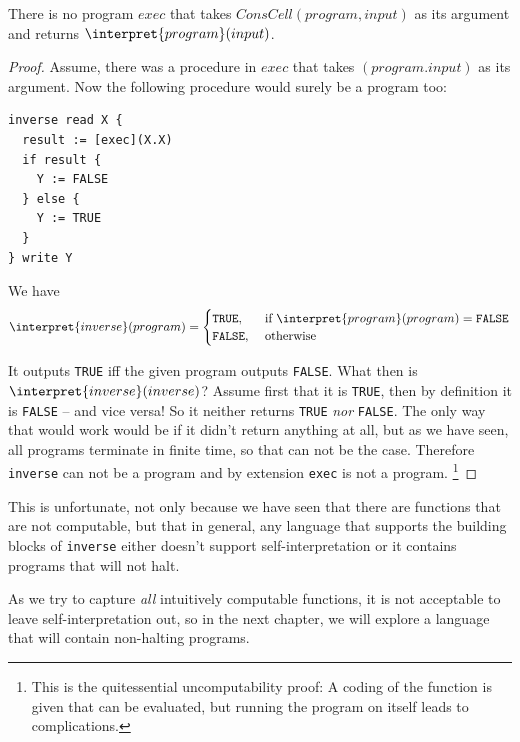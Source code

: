 \begin{theorem}
	There is no \FOR program $exec$ that takes $ConsCell(program, input)$ as its 
	argument and returns $\interpret{program}(input)$.
\end{theorem}
\begin{proof}
Assume, there was a procedure in \FOR $exec$ that takes $(program.input)$ as 
its argument. Now the following procedure would surely be a \FOR program too:

\begin{verbatim}
inverse read X {
  result := [exec](X.X)
  if result {
    Y := FALSE
  } else {
    Y := TRUE
  }
} write Y
\end{verbatim}

We have 
\[ \interpret{inverse}(program) = \begin{cases}
		\mathtt{TRUE}, &\text{ if }\interpret{program}(program) = \mathtt{FALSE} \\
		\mathtt{FALSE}, &\text{ otherwise }
	\end{cases} \]

It outputs {\tt TRUE} iff the given program outputs {\tt FALSE}. What then 
is $\interpret{inverse}(inverse)$? Assume first that it is 
{\tt TRUE}, then by definition it is {\tt FALSE} -- and vice versa! So it 
neither returns {\tt TRUE} {\em nor} {\tt FALSE}. The only way that would 
work would be if it didn't return anything at all, but as we have seen, all 
\FOR programs terminate in finite time, so that can not be the case. 
Therefore {\tt inverse} can not be a \FOR program and by extension {\tt exec} 
is not a \FOR program. 
\footnote{This is the quitessential uncomputability 
	proof: A coding of the function is given that can be evaluated, but running 
  the program on itself leads to complications.}
\end{proof}

This is unfortunate, not only because we have seen that there are functions 
that are not \FOR computable, but that in general, any language that supports 
the building blocks of {\tt inverse} either doesn't support 
self-interpretation or it contains programs that will not halt.

As we try to capture {\em all} intuitively computable functions, it is not 
acceptable to leave self-interpretation out, so in the next chapter, we will 
explore a language that will contain non-halting programs.


